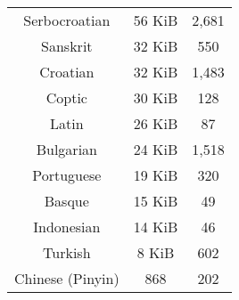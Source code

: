 \documentclass[a4paper,conference]{IEEEtran}
\begin{document}
\begin{table}[tbp]
\begin{tabular}{c|c|c}
    Serbocroatian & 56 KiB & 2,681 \\
    Sanskrit & 32 KiB & 550 \\
    Croatian & 32 KiB & 1,483\\
    Coptic & 30 KiB & 128 \\
    Latin & 26 KiB & 87 \\
    Bulgarian & 24 KiB & 1,518\\
    Portuguese & 19 KiB & 320\\
    Basque & 15 KiB & 49\\
    Indonesian & 14 KiB & 46\\
    Turkish & 8 KiB & 602\\
    Chinese (Pinyin) & 868 & 202 \\
    \hline
  \end{tabular}
\end{table}
\end{document}
